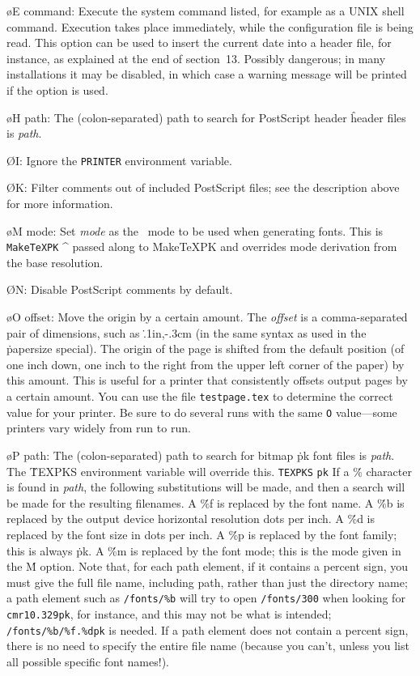 {\o E command:
Execute the system command listed, for example as a UNIX shell command.
Execution takes place immediately, while the configuration file is
being read. This option can be used to insert the current date into a
header file, for instance, as explained at the end
of section~13.  Possibly dangerous; in many
installations it may be disabled, in which case a warning message will
be printed if the option is used.

\o H path:
The (colon-separated) path to search for PostScript header 
\^{header}
files is {\it path}.

\O I:
Ignore the {\tt PRINTER} environment variable.

\O K:
Filter comments out of included PostScript files; see the description
above for more information.

\o M mode: Set {\it mode}
as the \MF\ mode to be used when generating fonts.  This is
\^{{\tt MakeTeXPK}}
\^{{\MF}}
passed along to \.{MakeTeXPK} and overrides mode derivation from the
base resolution.

\O N:  Disable PostScript comments by default.

\o O offset:
Move the origin by a certain amount.  The {\it offset} is a comma-separated
pair of dimensions, such as \.{.1in,-.3cm} (in the same syntax as used in
the \.{papersize} special).   The origin of the page is shifted from the
default position (of one inch down, one inch to the right from the upper
left corner of the paper) by this amount.
This is useful for a printer that consistently offsets output pages by a
certain amount. You can use the file {\tt testpage.tex} to determine
the correct value for your printer. Be sure to do several runs with the
same {\tt O} value---some printers vary widely from run to run.

\o P path:  The (colon-separated) path to search for bitmap \.{pk}
font files is
{\it path}.  The \.{TEXPKS} environment variable will override this.
\^{{\tt TEXPKS}}
\^{{\tt pk}}
If a \.{\%} character is found in {\it path},
the following substitutions will be made, and then a search will
be made for the resulting filenames.
A \.{\%f} is replaced by the font name.
A \.{\%b} is replaced by the output device horizontal resolution dots per inch.
A \.{\%d} is replaced by the font size in dots per inch.
A \.{\%p} is replaced by the font family; this is always \.{pk}.
A \.{\%m} is replaced by the font mode; this is the mode given
in the \.{M} option.
Note that, for each path element, if it contains a percent sign, you
must give the full file name, including path, rather than just the
directory name; a path element such as {\tt /fonts/\%b} will try to
open {\tt /fonts/300} when looking for {\tt cmr10.329pk}, for
instance, and this may not be what is intended; {\tt /fonts/\%b/\%f.\%dpk}
is needed.  If a path element does not contain a percent sign, there
is no need to specify the entire file name (because you can't, unless
you list all possible specific font names!).
  
}
